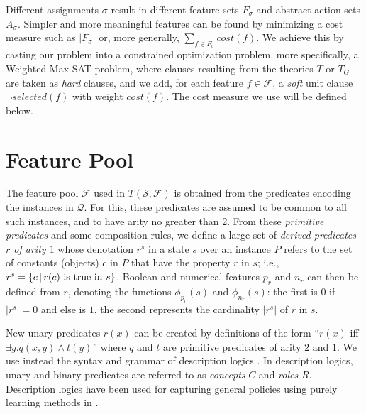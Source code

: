 \documentclass[letterpaper]{article} %
\newcommand{\Omit}[1]{}
\newtheorem{theorem}[definition]{Theorem}
\newcommand{\Q}{\mathcal{Q}}
\newcommand{\F}{\mathcal{F}}
\renewcommand{\S}{\mathcal{S}}
\begin{document}
\Omit{
Due to  \eqref{eq:d1} and \eqref{eq:goal} that force the selected features in $F_{\sigma}$
to   distinguish goal  from non-goal states, we have that:

\begin{theorem}
For a satisfying assignment $\sigma$  of $T(\S,\F)$, 
$s$ is expanded goal   state in $\S$  iff  $s$ satisfies  $G_F=G_{\sigma}$.
\end{theorem}
}
% 

Different assignments $\sigma$ result in different feature sets $F_{\sigma}$
and abstract action sets $A_{\sigma}$. Simpler and more meaningful features can be found 
by minimizing a cost measure such as $|F_{\sigma}|$
or, more generally, $\sum_{f \in F_{\sigma}} cost(f)$.
We achieve this by casting our problem
into a constrained optimization problem, more specifically, a Weighted Max-SAT problem,
where clauses resulting from the theories $T$ or $T_G$ are taken as \emph{hard} clauses,
and we add, for each feature $f \in \F$, a
\emph{soft} unit clause $\neg selected(f)$ with weight $cost(f)$.
The cost measure we use will be defined below.


\section{Feature Pool}

The feature pool $\F$ used in $T(\S,\F)$ is obtained 
from the   predicates encoding  the instances in $\Q$.
For this, these predicates are assumed to be common to
all such instances, and to have arity no greater than 2.
From these \emph{primitive predicates} and some composition rules,
we define a large set of \emph{derived predicates $r$ of arity $1$}
whose denotation $r^s$ in a state $s$ over an instance $P$
refers to the set of constants (objects) $c$ in $P$ that
have the property $r$ in $s$; i.e., $r^s=\{c \, | \, r(c) \hbox{ is true in $s$}\}$.
Boolean and numerical features $p_r$ and $n_r$ can then be defined from  $r$,
denoting the functions $\phi_{p_r}(s)$ and $\phi_{n_r}(s)$: the first is $0$
if $|r^s|=0$ and else is $1$, the second represents the cardinality $|r^s|$ of $r$ in $s$.



New unary predicates $r(x)$ can be created by definitions of the form ``$r(x)$ iff $\exists y. q(x,y) \land t(y)$''
where $q$ and $t$ are  primitive  predicates of arity $2$ and $1$. We  use   instead the syntax and  grammar
of  description logics \cite{dl-handbook}.  In description logics, unary and binary predicates
are referred to as \emph{concepts} $C$  and \emph{roles} $R$. Description logics  have been used 
for capturing general policies using purely learning methods in  \cite{martin-geffner:generalized,fern:bias}.
\end{document}
